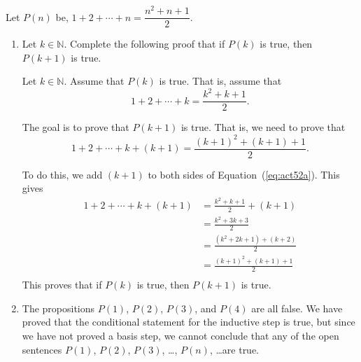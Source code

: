 \documentclass[11pt]{article}
\begin{document}
\setcounter{equation}{0}
Let  $P\left( n \right)$ be, $1 + 2 +  \cdots  + n = \dfrac{{n^2  + n + 1}}
{2}$.

\begin{enumerate}
\item Let  $k \in \mathbb{N}$.  Complete the following proof that if  $P\left( k \right)$ is true, then  $P\left( {k + 1} \right)$ is true.

Let  $k \in \mathbb{N}$.  Assume that  $P\left( k \right)$ is true.  That is, assume that
\begin{equation} \label{eq:act52a}
1 + 2 +  \cdots  + k = \frac{{k^2  + k + 1}}{2}.
\end{equation}

The goal is to prove that  $P\left( {k + 1} \right)$ is true.  That is, we need to prove that
\begin{equation} \label{eq:act52b}
1 + 2 +  \cdots  + k + \left( {k + 1} \right) = \frac{{\left( {k + 1} \right)^2  + \left( {k + 1} \right) + 1}}{2}.
\end{equation}

To do this, we add  $\left( {k + 1} \right)$ to both sides of Equation~(\ref{eq:act52a}).  This gives
\[
\begin{aligned}
  1 + 2 +  \cdots  + k + \left( {k + 1} \right) &= \frac{{k^2  + k + 1}}{2} + \left( {k + 1} \right) \\ 
               &= \frac{{k^2  + 3k + 3}}{2} \\ 
               &= \frac{{\left( {k^2  + 2k + 1} \right) + \left( {k + 2} \right)}}{2} \\ 
               &= \frac{{\left( {k + 1} \right)^2  + \left( {k + 1} \right) + 1}}{2} \\ 
\end{aligned}
\]
This proves that if  $P\left( k \right)$ is true, then  $P\left( {k + 1} \right)$ is true.

\item The propositions  $P\left( 1 \right)$, $P\left( 2 \right)$,  $P\left( 3 \right)$, and 
$P\left( 4 \right)$  are all false.  We have proved that the conditional statement for the inductive step is true, but since we have not proved a basis step, we cannot conclude that any of the open sentences $P(1)$, $P(2)$, $P(3)$, \ldots, $P(n)$, \ldots  are true.
\end{enumerate}
\end{document}
